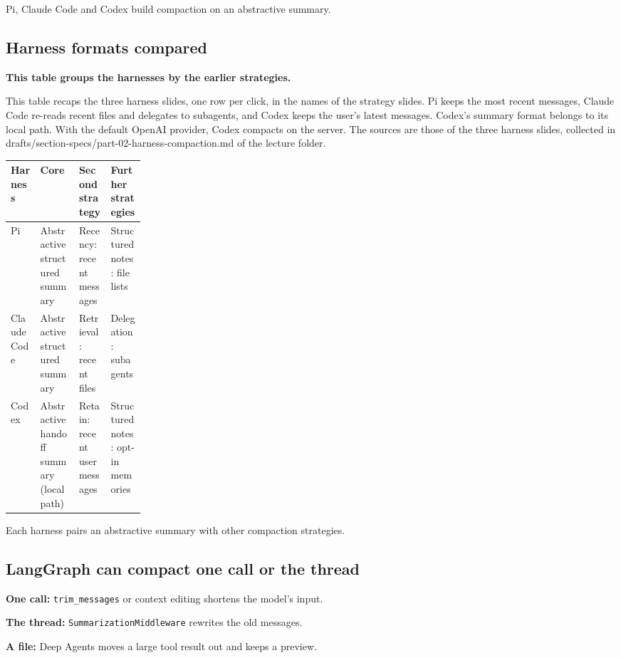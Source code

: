\begin{takeaway}Pi, Claude Code and Codex build compaction on an abstractive summary.\end{takeaway}

\subsection{Harness formats compared}
\label{sec:it-7-5e}

\textbf{This table groups the harnesses by the earlier strategies.}

This table recaps the three harness slides, one row per click, in the names of the strategy slides. Pi keeps the most recent messages, Claude Code re-reads recent files and delegates to subagents, and Codex keeps the user's latest messages. Codex's summary format belongs to its local path. With the default OpenAI provider, Codex compacts on the server. The sources are those of the three harness slides, collected in drafts/section-specs/part-02-harness-compaction.md of the lecture folder.

\begin{center}\footnotesize
\begin{tabularx}{\linewidth}{L{0.22\linewidth}XXX}
\toprule
\textbf{Harness} & \textbf{Core} & \textbf{Second strategy} & \textbf{Further strategies} \\
\midrule
Pi & Abstractive structured summary & Recency: recent messages & Structured notes: file lists \\
Claude Code & Abstractive structured summary & Retrieval: recent files & Delegation: subagents \\
Codex & Abstractive handoff summary (local path) & Retain: recent user messages & Structured notes: opt-in memories \\
\bottomrule
\end{tabularx}
\end{center}

\begin{takeaway}Each harness pairs an abstractive summary with other compaction strategies.\end{takeaway}

\subsection{LangGraph can compact one call or the thread}
\label{sec:it-7-6}

\bi
\item \textbf{One call:} \texttt{trim\_messages} or context editing shortens the model's input.
\item \textbf{The thread:} \texttt{SummarizationMiddleware} rewrites the old messages.
\item \textbf{A file:} Deep Agents moves a large tool result out and keeps a preview.
\ei

